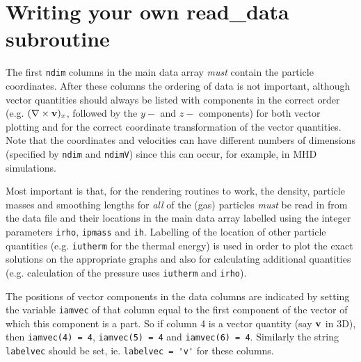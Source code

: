 \documentclass[a4paper,11pt]{article}
\begin{document}
\newpage

\section{Writing your own read\_data subroutine}
\label{sec:writeyourown}
The first \verb+ndim+ columns in the main data array \emph{must} contain the particle coordinates.
After these columns the ordering of data is not important, although vector quantities should
always be listed with components in the correct order (e.g. $(\nabla\times {\bf v})_x$,
followed by the $y-$ and $z-$ components) for both vector plotting and for the
correct coordinate transformation of the vector quantities. Note that the coordinates and velocities can have different
numbers of dimensions (specified by \verb+ndim+ and \verb+ndimV+) since this can occur, for example, in MHD simulations.

Most important is that, for the rendering routines to work, the density, particle
masses and smoothing lengths for \emph{all} of the (gas) particles \emph{must} be read in from
the data file and their locations in the main data array labelled using the integer
parameters \verb+irho+, \verb+ipmass+ and \verb+ih+. Labelling of the location of other particle
quantities (e.g. \verb+iutherm+ for the thermal energy) is used in
order to plot the exact solutions on the appropriate graphs and also for calculating
additional quantities (e.g. calculation of the pressure uses \verb+iutherm+ and
\verb+irho+).

 The positions of vector components in the data columns are indicated by setting the variable \verb+iamvec+ of that
column equal to the first component of the vector of which this component is a part. So if column 4
is a vector quantity (say ${\bf v}$ in 3D), then \verb+iamvec(4) = 4+, \verb+iamvec(5) = 4+ and
\verb+iamvec(6) = 4+. Similarly the string \verb+labelvec+ should be set, ie. \verb+labelvec = 'v'+ for these columns.



\end{document}

